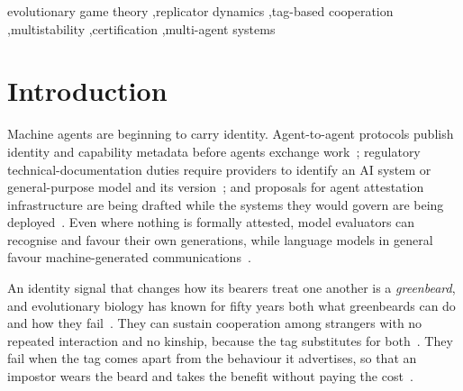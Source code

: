 \documentclass[preprint,12pt]{elsarticle}
\theoremstyle{plain}
\theoremstyle{definition}
\begin{document}
\begin{frontmatter}
\begin{keyword}
evolutionary game theory \sep replicator dynamics \sep tag-based cooperation
\sep multistability \sep certification \sep multi-agent systems
\end{keyword}

\end{frontmatter}


\section{Introduction}
\label{sec:intro}

Machine agents are beginning to carry identity. Agent-to-agent protocols
publish identity and capability metadata before agents exchange
work~\citep{a2a2026spec}; regulatory technical-documentation duties require
providers to identify an AI system or general-purpose model and its
version~\citep{euaiact2024}; and proposals for agent attestation infrastructure
are being drafted while the systems they would govern are being
deployed~\citep{chan2024visibility,chan2025infrastructure,shavit2023practices}.
Even where nothing is formally attested, model evaluators can recognise and
favour their own generations, while language models in general favour
machine-generated communications~\citep{panickssery2024llm,laurito2025aiai}.

An identity signal that changes how its bearers treat one another is a
\emph{greenbeard}, and evolutionary biology has known for fifty years both what
greenbeards can do and how they
fail~\citep{hamilton1964genetical1,dawkins1976selfish}. They can sustain
cooperation among strangers with no repeated interaction and no kinship,
because the tag substitutes for
both~\citep{riolo2001evolution,traulsen2003minimal}. They fail when the tag
comes apart from the behaviour it advertises, so that an impostor wears the
beard and takes the benefit without paying the
cost~\citep{roberts2002does,jansen2006altruism,gardner2010greenbeards}.
\end{document}
